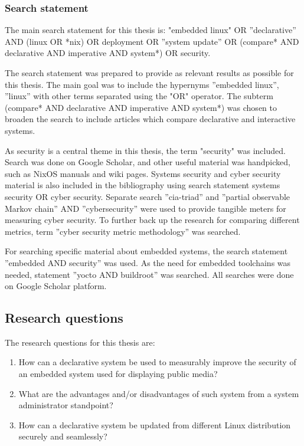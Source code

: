 \subsubsection{Search statement} \label{searchstatement}

The main search statement for this thesis is: "embedded linux" OR
''declarative'' AND (linux OR *nix) OR deployment OR ''system update''
OR (compare* AND declarative AND imperative AND system*) OR security.

The search statement was prepared to provide as relevant results as
possible for this thesis. The main goal was to include the hypernyms
''embedded linux'', ''linux'' with other terms separated using the
"OR" operator. The subterm (compare* AND declarative AND imperative
AND system*) was chosen to broaden the search to include articles
which compare declarative and interactive systems.

As security is a central theme in this thesis, the term "security" was
included. Search was done on Google Scholar, and other useful material
was handpicked, such as NixOS manuals and wiki pages. Systems security
and cyber security material is also included in the bibliography using
search statement systems security OR cyber security. Separate search
''cia-triad'' and ''partial observable Markov chain'' AND
''cybersecurity'' were used to provide tangible meters for measuring
cyber security. To further back up the research for comparing
different metrics, term ''cyber security metric methodology'' was
searched.

For searching specific material about embedded systems, the search
statement ''embedded AND security'' was used. As the need for embedded
toolchains was needed, statement ''yocto AND buildroot'' was
searched. All searches were done on Google Scholar platform.

\subsection{Research questions} \label{resquest}

The research questions for this thesis are:

\begin{enumerate}
\item How can a declarative system be used to measurably improve the
  security of an embedded system used for displaying public media?
\item What are the advantages and/or disadvantages of such system from
  a system administrator standpoint?
\item How can a declarative system be updated from different Linux
  distribution securely and seamlessly?
\end{enumerate}

